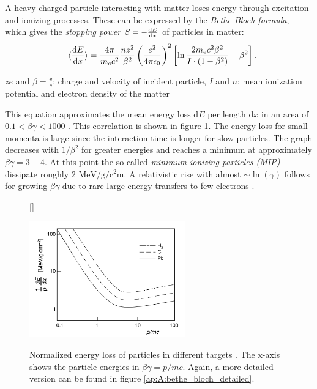 A heavy charged particle interacting with matter loses energy through excitation and ionizing processes. These  can be expressed by the \textit{Bethe-Bloch formula}, which gives the \textit{stopping power} $S=-\dv{E}{x}$ of particles in matter: 
\begin{align}
-\langle\dv{E}{x}\rangle=\frac{4\pi}{m_ec^2}\frac{nz^2}{\beta^2}\left(\frac{e^2}{4\pi\epsilon_0}\right)^2\left[\ln\frac{2m_ec^2\beta^2}{I\cdot(1-\beta^2)}-\beta^2\right].
\label{eq:bethe_bloch}
\end{align}
\begin{center}
	\centering
	\small
	$ze$ and $\beta=\frac{v}{c}$: charge and velocity of incident particle, $I$ and $n$: mean ionization potential and electron density of the matter 
\end{center}
This equation approximates the mean energy loss d$E$ per length d$x$ in an area of $0.1<\beta\gamma<1000$ \cite{PDG}. This correlation is shown in figure \ref{fig:ch1:bethe_bloch}. The energy loss for small momenta is large since the interaction time is longer for slow particles. The graph decreases with $1/\beta^2$ for greater energies and reaches a minimum at approximately $\beta\gamma=3-4$. At this point the so called \textit{minimum ionizing particles (MIP)} dissipate roughly 2 $\si{\MeV\per\gram\per\square\centi\meter}$. A relativistic rise with almost $\sim\ln(\gamma)$ follows for growing $\beta\gamma$ due to rare large energy transfers to few electrons \cite{PDG}. \par 
\begin{figure}[b]
	[\FBwidth]
	{\caption[Interaction of charged particles with matter]{Normalized energy loss of particles in different targets \cite{povh}. The x-axis shows the particle energies in $\beta\gamma=p/mc$. Again, a more detailed version can be found in figure \ref{ap:A:bethe_bloch_detailed}.}    
		\label{fig:ch1:bethe_bloch}}
	{\includegraphics[width=0.6\textwidth]{./graphics/ch1/bethe_bloch.png}}
\end{figure}
